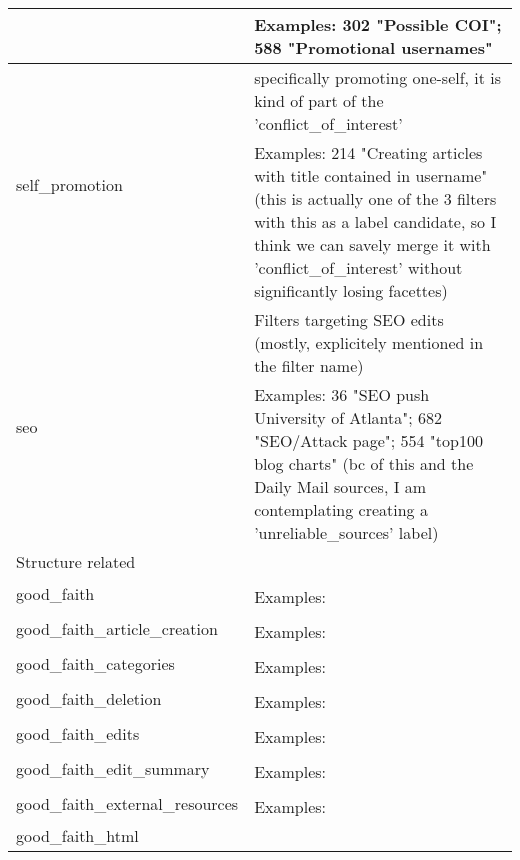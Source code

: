 \begin{longtable}{ | p{5cm} | p{9cm} | }
                                     & Examples: 302 "Possible COI"; 588 "Promotional usernames"\\
    \hline
    \multirow{2}{*}{self\_promotion} & specifically promoting one-self, it is kind of part of the 'conflict\_of\_interest'\\
                                     & Examples: 214 "Creating articles with title contained in username" (this is actually one of the 3 filters with this as a label candidate, so I think we can savely merge it with 'conflict\_of\_interest' without significantly losing facettes)\\
    \hline
    \multirow{2}{*}{seo} & Filters targeting SEO edits (mostly, explicitely mentioned in the filter name)\\
                                     & Examples: 36 "SEO push University of Atlanta"; 682 "SEO/Attack page"; 554 "top100 blog charts" (bc of this and the Daily Mail sources, I am contemplating creating a 'unreliable\_sources' label)\\
    \hline
        \multicolumn{2}{|l|}{Structure related} \\
    \hline
    \multirow{2}{*}{good\_faith} & \\
                                     & Examples:\\
    \hline
    \multirow{2}{*}{good\_faith\_article\_creation} & \\
                                     & Examples:\\
    \hline
    \multirow{2}{*}{good\_faith\_categories} & \\
                                     & Examples:\\
    \hline
    \multirow{2}{*}{good\_faith\_deletion} & \\
                                     & Examples:\\
    \hline
    \multirow{2}{*}{good\_faith\_edits} & \\
                                     & Examples:\\
    \hline
    \multirow{2}{*}{good\_faith\_edit\_summary} & \\
                                     & Examples:\\
    \hline
    \multirow{2}{*}{good\_faith\_external\_resources} & \\
                                     & Examples:\\
    \hline
    \multirow{2}{*}{good\_faith\_html} & \\

\end{longtable}
